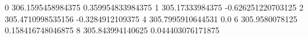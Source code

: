 0 306.1595458984375 0.359954833984375
1 305.17333984375 -0.626251220703125
2 305.4710998535156 -0.3284912109375
4 305.7995910644531 0.0
6 305.9580078125 0.158416748046875
8 305.843994140625 0.044403076171875
